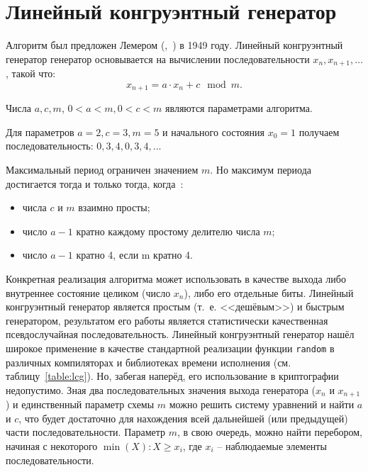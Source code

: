 \section{Линейный конгруэнтный генератор}\label{section-linear-congruential-generator}

Алгоритм был предложен Лемером (,~\cite{Lehmer:1951:1, Lehmer:1951:2}) в 1949 году. Линейный конгруэнтный генератор генератор основывается на вычислении последовательности $x_n, x_{n+1}, \dots$, такой что:
	\[x_{n+1} = a \cdot x_n + c \mod m.\]

Числа $a, c, m$, $ 0 < a < m, 0 < c < m$ являются параметрами алгоритма.

\example
Для параметров $a = 2, c = 3, m = 5$ и начального состояния $x_0 = 1$ получаем последовательность: $0, 3, 4, 0, 3, 4, \dots$
\exampleend

Максимальный период ограничен значением $m$. Но максимум периода достигается тогда и только тогда, когда~\cite[Линейный конгруэнтный метод]{Knuth:2001}:

\begin{itemize}
	\item числа $c$ и $m$ взаимно просты;
	\item число $a - 1$ кратно каждому простому делителю числа $m$;
	\item число $a - 1$ кратно 4, если m кратно 4.
\end{itemize}

Конкретная реализация алгоритма может использовать в качестве выхода либо внутреннее состояние целиком (число $x_n$), либо его отдельные биты. Линейный конгруэнтный генератор является простым (т.~е. <<дешёвым>>) и быстрым генератором, результатом его работы является статистически качественная псевдослучайная последовательность. Линейный конгруэнтный генератор нашёл широкое применение в качестве стандартной реализации функции \texttt{random} в различных компиляторах и библиотеках времени исполнения (см. таблицу~\ref{table:lcg}). Но, забегая наперёд, его использование в криптографии недопустимо. Зная два последовательных значения выхода генератора ($x_n$ и $x_{n+1}$) и единственный параметр схемы $m$ можно решить систему уравнений и найти $a$ и $c$, что будет достаточно для нахождения всей дальнейшей (или предыдущей) части последовательности. Параметр $m$, в свою очередь, можно найти перебором, начиная с некоторого $\min(X): X \geq x_i$, где $x_i$ -- наблюдаемые элементы последовательности.

